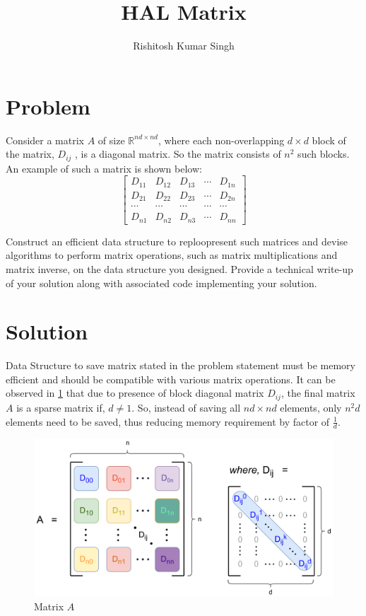 \documentclass[11pt,twocolumn]{article}
\title{HAL Matrix}
\author{Rishitosh Kumar Singh}
\begin{document}
\maketitle

\section{Problem}
    Consider a matrix $A$ of size $\mathbb{R}^{nd \times nd}$, where each non-overlapping $d \times d$ block of the matrix, $D_{ij}$ , is a diagonal matrix. So the matrix consists of $n^2$ such blocks. An example of such a matrix is shown below:
    \begin{equation}
        \nonumber
        \begin{bmatrix} D_{11} & D_{12} & D_{13} & \cdots & D_{1n} \\ D_{21} & D_{22} & D_{23} & \cdots & D_{2n} \\ \cdots & \cdots & \cdots & \cdots & \cdots \\ D_{n1} & D_{n2} & D_{n3} & \cdots & D_{nn} \end{bmatrix}
    \end{equation}

    Construct an efficient data structure to reploopresent such matrices and devise algorithms to perform matrix operations, such as matrix multiplications and matrix inverse, on the data structure you designed. Provide a technical write-up of your solution along with associated code implementing your solution.

\section{Solution}
    
    Data Structure to save matrix stated in the problem statement must be memory efficient and should be compatible with various matrix operations. It can be observed in \cref{img:matrix} that due to presence of block diagonal matrix $D_{ij}$, the final matrix $A$ is a sparse matrix if, $d \neq 1$. So, instead of saving all $nd \times nd$ elements, only $n^2d$ elements need to be saved, thus reducing memory requirement by factor of $\frac{1}{d}$.

    \begin{figure}[H]
        \includegraphics[width=\linewidth]{images/matrix.png}
        \caption{Matrix $A$}
        \label{img:matrix}    
    \end{figure}
\end{document}
